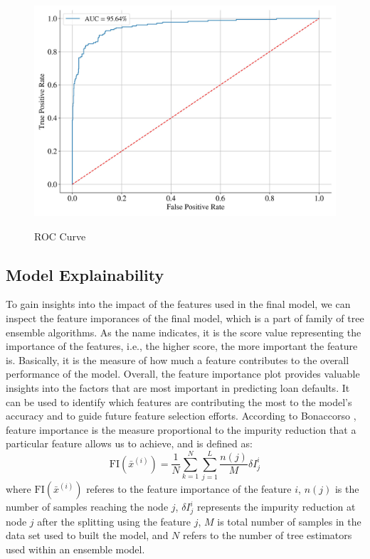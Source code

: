 \begin{figure}[H]
\centering
\caption{ROC Curve}\vspace{0.5em}
\label{fig:roc}\
\includegraphics[width=140mm]{Figures/ROC_curve_FINAL.jpg}

\vspace{-1em}
\end{figure}



\subsection{Model Explainability}
\label{subsec:explainability}

To gain insights into the impact of the features used in the final model, we can inspect the feature imporances of the final model, which is a part of family of tree ensemble algorithms.
As the name indicates, it is the score value representing the importance of the features, i.e., the higher score, the more important the feature is. Basically, it is the measure of how much a feature contributes to the overall performance of the model.
Overall, the feature importance plot provides valuable insights into the factors that are most important in predicting loan defaults. It can be used to identify which features are contributing the most to the model's accuracy and to guide future feature selection efforts.
According to Bonaccorso \citep{bonaccorso2020mastering}, feature importance is the measure proportional to the impurity reduction that a particular feature allows us to achieve, and is defined as:
\begin{equation}\label{eq}
    \text{FI}\left(\bar{x}^{\left(i\right)}\right) = \frac{1}{N} \displaystyle\sum_{k=1}^{N} \displaystyle\sum_{j=1}^{L} \frac{n(j)}{M} \delta I_{j}^{i}
\end{equation}
where $ \text{FI}\left(\bar{x}^{\left(i\right)}\right)$ referes to the feature importance of the feature $i$, $n(j)$ is the number of samples reaching the node $j$, $\delta I_{j}^{i}$ represents the impurity reduction at node $j$ after the splitting using the feature $j$, $M$ is total number of samples in the data set used to built the model, and $N$ refers to the number of tree estimators used within an ensemble model.

